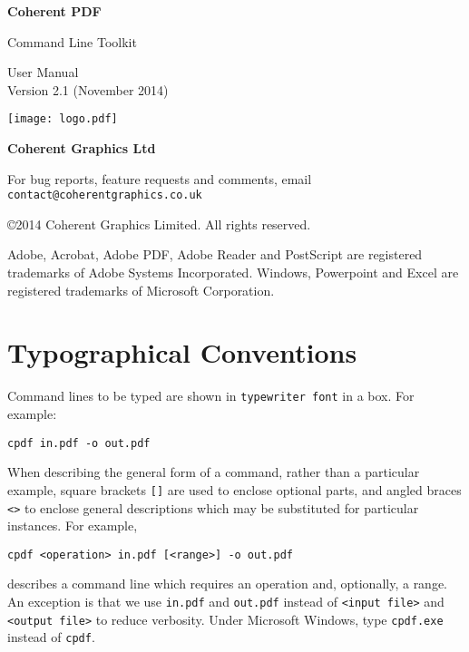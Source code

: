 \documentclass{book}
\newcommand{\smallgap}{\bigskip}
\begin{document}
\frontmatter
\pagestyle{empty}

\begin{flushright}

{\sffamily \bfseries \Huge Coherent PDF

\vspace{2mm}
Command Line Toolkit}

\vspace{12mm}

{\Huge User Manual}\\
Version 2.1 (November 2014)

\vspace{25mm}

\vfill

\texttt{[image: logo.pdf]}

\vspace{2mm}
{\sffamily \bfseries \LARGE Coherent Graphics Ltd}

\end{flushright}

\clearpage

\pagestyle{empty}
\noindent For bug reports, feature requests and comments, email\\ \texttt{contact@coherentgraphics.co.uk}

\vspace*{\fill}
\noindent\copyright 2014 Coherent Graphics Limited. All rights reserved.

\smallgap 
\noindent Adobe, Acrobat, Adobe PDF, Adobe Reader and PostScript are
registered trademarks of Adobe Systems Incorporated. Windows, Powerpoint and
Excel are registered trademarks of Microsoft Corporation.

\cleardoublepage
\tableofcontents

\cleardoublepage
\chapter*{Typographical Conventions}
Command lines to be typed are shown in \texttt{typewriter font} in a box.
For example:
\begin{framed}
\small\verb!cpdf in.pdf -o out.pdf!
\end{framed}
\noindent When describing the general form of a command, rather than a particular
example, square brackets \verb|[]| are used to enclose optional parts, and
angled braces \verb!<>! to enclose general descriptions which may be
substituted for particular instances. For example,
\begin{framed}
\small\verb!cpdf <operation> in.pdf [<range>] -o out.pdf!
\end{framed}
\noindent describes a command line which requires an operation and, optionally,
a range. An exception is that we use \texttt{in.pdf} and \texttt{out.pdf}
instead of \texttt{<input file>} and \texttt{<output file>} to reduce
verbosity. Under Microsoft Windows, type \texttt{cpdf.exe} instead of \texttt{cpdf}.
\cleardoublepage
\mainmatter
\pagestyle{headings}
\end{document}
